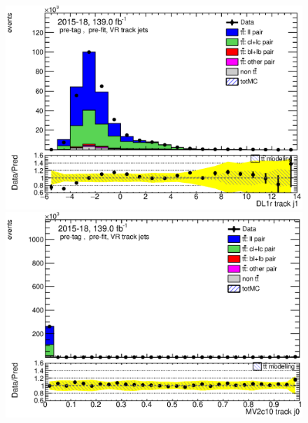 \documentclass[letterpaper,12pt]{article}
\begin{document}
\begin{figure}[H]
\begin{minipage}[b]{.45\textwidth}
	\end{minipage}\hfill
	\begin{minipage}[b]{.45\textwidth}
	\centering
	\includegraphics[width=1\textwidth]{Oct_distributions/pretagNoRwDL1rwithhighpTVRJets_scaledall/DataMC__J1_DL1r.eps}
	\end{minipage}\hfill
	\begin{minipage}[b]{.45\textwidth}
	\centering
	\includegraphics[width=1\textwidth]{Oct_distributions/pretagNoRwDL1rwithhighpTVRJets_scaledall/DataMC_J0_MV2c10.eps}
	\end{minipage}\hfill
	\begin{minipage}[b]{.45\textwidth}
	\centering

\end{minipage}
\end{figure}
\end{document}
